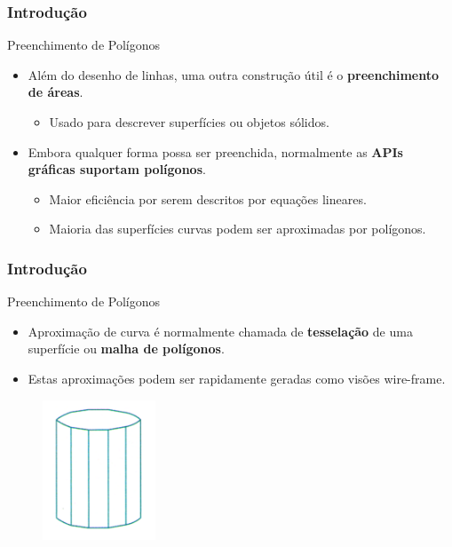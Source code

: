 \documentclass{beamer}
\begin{document}
\begin{frame}
\frametitle{Introdução}

		\begin{block}{Preenchimento de Polígonos}
		\begin{itemize}
			\item Além do desenho de linhas, uma outra construção útil é o \textbf{preenchimento de áreas}.
				\begin{itemize}
					\item Usado para descrever superfícies ou objetos sólidos.
				\end{itemize}
			\item Embora qualquer forma possa ser preenchida, normalmente as \textbf{APIs gráficas suportam polígonos}.
				\begin{itemize}
					\item Maior eficiência por serem descritos por equações lineares.
					\item Maioria das superfícies curvas podem ser aproximadas por polígonos. 
				\end{itemize}
		\end{itemize}
		\end{block}
	
\end{frame}

\begin{frame}
\frametitle{Introdução}

		\begin{block}{Preenchimento de Polígonos}
		\begin{itemize}
			\item Aproximação de curva é normalmente chamada de \textbf{tesselação} de uma superfície ou \textbf{malha de polígonos}.
				\item Estas aproximações podem ser rapidamente geradas como visões wire-frame.
		\end{itemize}
		\end{block}
		
		\begin{figure}[!h]
			\begin{center}
				\includegraphics[width=0.3\textwidth]{Figures/WirFra}
			\end{center}
		\end{figure}
	
\end{frame}
\end{document}
